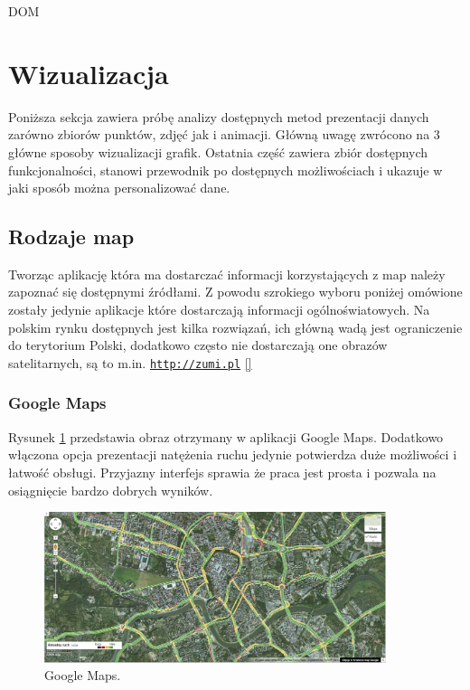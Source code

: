 DOM

\section{Wizualizacja}
\label{sec:wizualizacja}

Poniższa sekcja zawiera próbę analizy dostępnych metod prezentacji danych zarówno zbiorów punktów, zdjęć jak i animacji. Główną uwagę zwrócono na 3 główne sposoby wizualizacji grafik. Ostatnia część zawiera zbiór dostępnych funkcjonalności, stanowi przewodnik po dostępnych możliwościach i ukazuje w jaki sposób można personalizować dane.


\subsection{Rodzaje map}
\label{subsec:Rodzaje map}

Tworząc aplikację która ma dostarczać informacji korzystających z map należy zapoznać się dostępnymi źródłami. Z powodu szrokiego wyboru poniżej omówione zostały jedynie aplikacje które dostarczają informacji ogólnoświatowych. Na polskim rynku dostępnych jest kilka rozwiązań, ich główną wadą jest ograniczenie do terytorium Polski, dodatkowo często nie dostarczają one obrazów satelitarnych, są to m.in. \underline{\texttt{http://zumi.pl}}
\ref{}

\subsubsection{Google Maps}
\label{subsubsec:Google Maps}
\nocite{googlemapsbegin}
Rysunek \ref{fig:googleMaps_1} przedstawia obraz otrzymany w aplikacji Google Maps. Dodatkowo włączona opcja prezentacji natężenia ruchu jedynie potwierdza duże możliwości i łatwość obsługi. Przyjazny interfejs sprawia że praca jest prosta i pozwala na osiągnięcie bardzo dobrych wyników.


\begin{figure}[H]
  \centering
    \includegraphics[width=100mm]{ge/gm_1.jpg}
  \caption{Google Maps.}
  \label{fig:googleMaps_1}
\end{figure}


